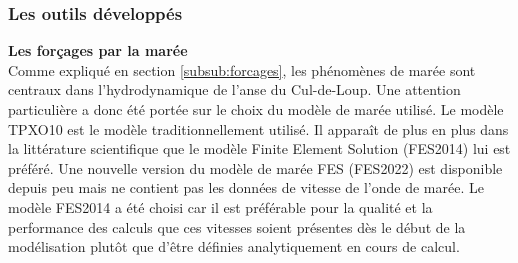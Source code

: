 \documentclass[10pt,a4paper,titlepage]{article}
\begin{document}





\subsubsection{Les outils développés}
\label{subsub:outils_dev}
\textbf{Les forçages par la marée}\\
Comme expliqué en section \ref{subsub:forcages}, les phénomènes de marée sont centraux dans l'hydrodynamique de l'anse du Cul-de-Loup.
Une attention particulière a donc été portée sur le choix du modèle de marée utilisé.
Le modèle TPXO10 est le modèle traditionnellement utilisé.
Il apparaît de plus en plus dans la littérature scientifique que le modèle Finite Element Solution (FES2014) \parencite{FES2014} lui est préféré.
Une nouvelle version du modèle de marée FES (FES2022) est disponible depuis peu mais ne contient pas les données de vitesse de l'onde de marée.
Le modèle FES2014 a été choisi car il est préférable pour la qualité et la performance des calculs que ces vitesses soient présentes dès le début de la modélisation plutôt que d'être définies analytiquement en cours de calcul.
\end{document}
